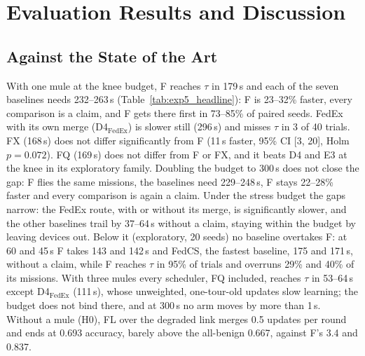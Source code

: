 \section{Evaluation Results and Discussion}
\label{sec:results}

\subsection{Against the State of the Art}
\label{sec:res:sota}

With one mule at the knee budget, F reaches $\tau$ in 179\,s and each of the
seven baselines needs 232--263\,s (Table~\ref{tab:exp5_headline}): F is
23--32\% faster, every comparison is a claim, and F gets there first in
73--85\% of paired seeds. FedEx with its own merge (D4$_{\text{FedEx}}$) is
slower still (296\,s) and misses $\tau$ in 3 of 40 trials. FX (168\,s) does not
differ significantly from F (11\,s faster, 95\% CI [3, 20], Holm $p=0.072$).
FQ (169\,s) does not differ from F or FX, and it beats D4 and E3 at the knee in
its exploratory family. Doubling the budget to 300\,s does not close the gap: F
flies the same missions, the baselines need 229--248\,s, F stays 22--28\% faster
and every comparison is again a claim. Under the stress budget the gaps narrow:
the FedEx route, with or without its merge, is significantly slower, and the other
baselines trail by 37--64\,s without a claim, staying within the budget by
leaving devices out. Below it (exploratory, 20 seeds) no baseline overtakes F: at
60 and 45\,s F takes 143 and 142\,s and FedCS, the fastest baseline, 175 and
171\,s, without a claim, while F reaches $\tau$ in 95\% of trials and overruns
29\% and 40\% of its missions. With three mules every scheduler, FQ included, reaches
$\tau$ in 53--64\,s except D4$_{\text{FedEx}}$ (111\,s), whose unweighted, one-tour-old
updates slow learning; the budget does not bind there, and at 300\,s no arm moves
by more than 1\,s. Without a mule (H0), FL over the degraded link merges
0.5 updates per round and ends at 0.693 accuracy, barely above the all-benign
0.667, against F's 3.4 and 0.837.

